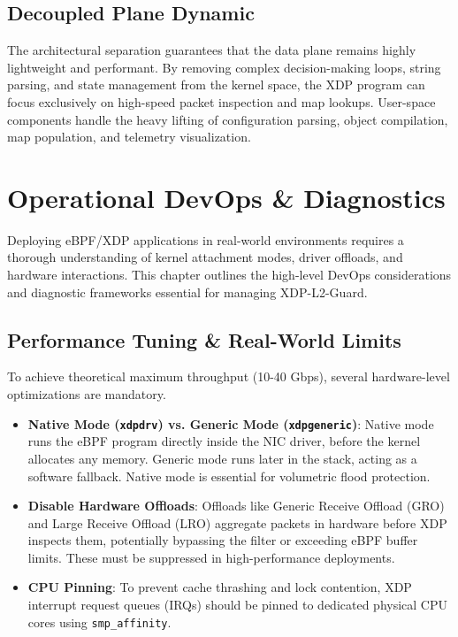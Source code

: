 \documentclass[11pt,a4paper]{article}
\begin{document}
\subsection{Decoupled Plane Dynamic}

The architectural separation guarantees that the data plane remains highly lightweight and performant.
By removing complex decision-making loops, string parsing, and state management from the kernel space, the XDP program can focus exclusively on high-speed packet inspection and map lookups.
User-space components handle the heavy lifting of configuration parsing, object compilation, map population, and telemetry visualization.

\section{Operational DevOps \& Diagnostics}

Deploying eBPF/XDP applications in real-world environments requires a thorough understanding of kernel attachment modes, driver offloads, and hardware interactions.
This chapter outlines the high-level DevOps considerations and diagnostic frameworks essential for managing XDP-L2-Guard.

\subsection{Performance Tuning \& Real-World Limits}
To achieve theoretical maximum throughput (10-40 Gbps), several hardware-level optimizations are mandatory.
\begin{itemize}
    \item \textbf{Native Mode (\texttt{xdpdrv}) vs. Generic Mode (\texttt{xdpgeneric})}: Native mode runs the eBPF program directly inside the NIC driver, before the kernel allocates any memory.
Generic mode runs later in the stack, acting as a software fallback. Native mode is essential for volumetric flood protection.
    \item \textbf{Disable Hardware Offloads}: Offloads like Generic Receive Offload (GRO) and Large Receive Offload (LRO) aggregate packets in hardware before XDP inspects them, potentially bypassing the filter or exceeding eBPF buffer limits.
These must be suppressed in high-performance deployments.
    \item \textbf{CPU Pinning}: To prevent cache thrashing and lock contention, XDP interrupt request queues (IRQs) should be pinned to dedicated physical CPU cores using \texttt{smp\_affinity}.
\end{itemize}
\end{document}
